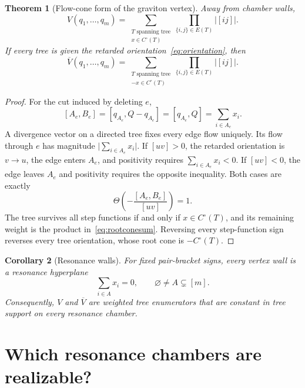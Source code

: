 \documentclass[11pt]{article}
\newtheorem{theorem}{Theorem}[section]
\newtheorem{corollary}[theorem]{Corollary}
\theoremstyle{definition}
\theoremstyle{remark}
\newcommand{\abs}[1]{\lvert #1\rvert}
\newcommand{\Vbar}{\overline V}
\begin{document}
\begin{theorem}[Flow-cone form of the graviton vertex]\label{thm:rootcone}
Away from chamber walls,
\begin{equation}\label{eq:rootconesum}
  V(q_1,\ldots,q_m)=
  \sum_{\substack{T\text{ spanning tree}\\x\in C^{\circ}(T)}}
  \prod_{\{i,j\}\in E(T)}\abs{[ij]}.
\end{equation}
If every tree is given the retarded orientation~\eqref{eq:orientation}, then
\begin{equation}
  \Vbar(q_1,\ldots,q_m)=
  \sum_{\substack{T\text{ spanning tree}\\-x\in C^{\circ}(T)}}
  \prod_{\{i,j\}\in E(T)}\abs{[ij]}.
\end{equation}
\end{theorem}

\begin{proof}
For the cut induced by deleting $e$,
\begin{equation}\label{eq:cutisflow}
  [A_e,B_e]=[q_{A_e},Q-q_{A_e}]
  =[q_{A_e},Q]=\sum_{i\in A_e}x_i.
\end{equation}
A divergence vector on a directed tree fixes every edge flow uniquely.  Its
flow through $e$ has magnitude $\abs{\sum_{i\in A_e}x_i}$.  If $[uv]>0$,
the retarded orientation is $v\to u$, the edge enters $A_e$, and positivity
requires $\sum_{i\in A_e}x_i<0$.  If $[uv]<0$, the edge leaves $A_e$ and
positivity requires the opposite inequality.  Both cases are exactly
\begin{equation}
  \Theta\!\left(-\frac{[A_e,B_e]}{[uv]}\right)=1.
\end{equation}
The tree survives all step functions if and only if $x\in C^{\circ}(T)$,
and its remaining weight is the product in~\eqref{eq:rootconesum}.  Reversing
every step-function sign reverses every tree orientation, whose root cone is
$-C^{\circ}(T)$.
\end{proof}

\begin{corollary}[Resonance walls]
For fixed pair-bracket signs, every vertex wall is a resonance hyperplane
\begin{equation}
  \sum_{i\in A}x_i=0,
  \qquad \varnothing\neq A\subsetneq[m].
\end{equation}
Consequently, $V$ and $\Vbar$ are weighted tree enumerators that are constant
in tree support on every resonance chamber.
\end{corollary}

\section{Which resonance chambers are realizable?}
\end{document}
